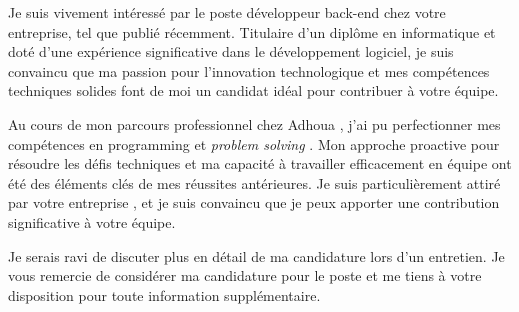 \documentclass[a4paper, 11pt]{report}
\begin{document}
\par
Je suis vivement intéressé par le poste développeur back-end  chez votre entreprise, tel que publié récemment. Titulaire d'un diplôme en informatique et doté d'une expérience significative dans le développement logiciel, je suis convaincu que ma passion pour l'innovation technologique et mes compétences techniques solides font de moi un candidat idéal pour contribuer à votre équipe.\\
\par
   Au cours de mon parcours professionnel chez Adhoua , j'ai pu perfectionner mes compétences en programming et \textit{problem solving}  . Mon approche proactive pour résoudre les défis techniques et ma capacité à travailler efficacement en équipe ont été des éléments clés de mes réussites antérieures. Je suis particulièrement attiré par votre entreprise , et je suis convaincu que je peux apporter une contribution significative à votre équipe.\\
\par
Je serais ravi de discuter plus en détail de ma candidature lors d'un entretien. Je vous remercie de considérer ma candidature pour le poste et me tiens à votre disposition pour toute information supplémentaire.
\end{document}
